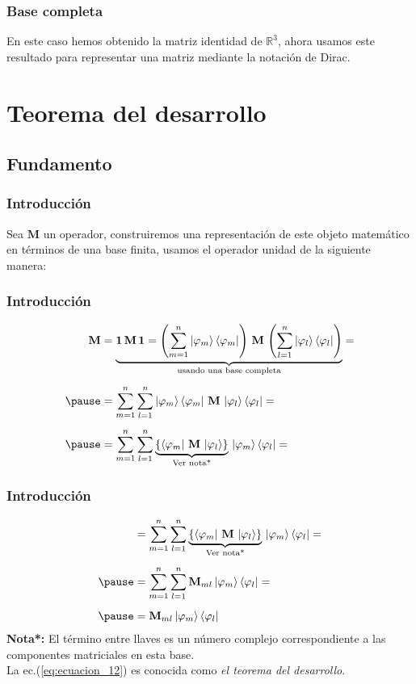 \documentclass[12pt]{beamer}
\begin{document}
\begin{frame}
\frametitle{Base completa}
En este caso hemos obtenido la matriz identidad de $\mathbb{R}^{3}$, ahora usamos este resultado para representar una matriz mediante la notación de Dirac.
\end{frame}
\section{Teorema del desarrollo}
\subsection{Fundamento}
\begin{frame}
\frametitle{Introducción}
Sea $\mathbf{M}$ un operador, construiremos una representación de este objeto matemático en términos de una base finita, usamos el operador unidad de la siguiente manera:
\end{frame}
\begin{frame}
\frametitle{Introducción}
\fontsize{12}{12}\selectfont
\begin{eqnarray}
\begin{aligned}[b]
\mathbf{M} &= \underbrace{\mathbf{1 \, M \, 1} =  \left( \sum_{m=1}^{n} \ket{\varphi_{m}} \bra{\varphi_{m}} \right) \, \mathbf{M} \, \left( \sum_{l=1}^{n} \ket{\varphi_{l}} \bra{\varphi_{l}} \right)}_{\text{usando una base completa}} = \\[0.5em] \pause
&= \sum_{m=1}^{n} \sum_{l=1}^{n} \ket{\varphi_{m}} \bra{\varphi_{m}} \, \mathbf{M} \, \ket{\varphi_{l}} \bra{\varphi_{l}} = \\[0.5em] \pause
&= \sum_{m=1}^{n} \sum_{l=1}^{n} \underbrace{\left\{ \bra{\varphi_{m}} \, \mathbf{M} \, \ket{\varphi_{l}} \right\}}_{\text{Ver nota*}} \, \ket{\varphi_{m}} \bra{\varphi_{l}} =
\end{aligned}
\nonumber
\end{eqnarray}
\end{frame}
\begin{frame}
\frametitle{Introducción}
\fontsize{12}{12}\selectfont
\begin{eqnarray}
\begin{aligned}[b]
&= \sum_{m=1}^{n} \sum_{l=1}^{n} \underbrace{\left\{ \bra{\varphi_{m}} \, \mathbf{M} \, \ket{\varphi_{l}} \right\}}_{\text{Ver nota*}} \, \ket{\varphi_{m}} \bra{\varphi_{l}} = \\[0.5em] \pause
&= \sum_{m=1}^{n} \sum_{l=1}^{n} \mathbf{M}_{ml} \ket{\varphi_{m}} \bra{\varphi_{l}} = \\[0.5em] \pause
&= \mathbf{M}_{ml} \ket{\varphi_{m}} \bra{\varphi_{l}}
\end{aligned}
\label{eq:ecuacion_12}
\end{eqnarray}
\textbf{Nota*: } El término entre llaves es un número complejo correspondiente a las componentes matriciales en esta base.
\\
\bigskip
\pause
La ec.(\ref{eq:ecuacion_12}) es conocida como \emph{el teorema del desarrollo}.
\end{frame}
\end{document}
